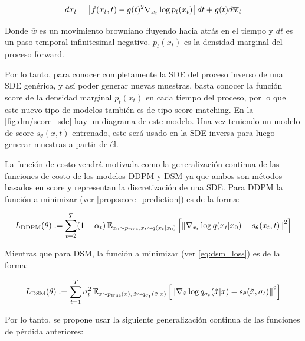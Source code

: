 \begin{equation}
    \label{eq:score_reverse_sde}
    dx_t = \left[f(x_t,t)-g(t)^2 \nabla_{x_t} \log p_t(x_t)\right]dt + g(t)d\overline{w}_t
\end{equation}

Donde $\overline{w}$ es un movimiento browniano fluyendo hacia atrás en el tiempo y $dt$ es un paso temporal infinitesimal negativo. $p_t(x_t)$ es la densidad marginal del proceso forward.

Por lo tanto, para conocer completamente la SDE del proceso inverso de una SDE genérica, y así poder generar nuevas muestras, basta conocer la función score de la densidad marginal $p_t(x_t)$ en cada tiempo del proceso, por lo que este nuevo tipo de modelos también es de tipo score-matching. En la \autoref{fig:dm/score_sde} hay un diagrama de este modelo. Una vez teniendo un modelo de score $s_\theta(x,t)$ entrenado, este será usado en la SDE inversa para luego generar muestras a partir de él.


La función de costo vendrá motivada como la generalización continua de las funciones de costo de los modelos DDPM y DSM ya que ambos son métodos basados en score y representan la discretización de una SDE. Para DDPM la función a minimizar (ver \autoref{prop:score_prediction}) es de la forma:

\begin{equation}
    L_{\text{DDPM}}(\theta) := \sum_{t=2}^T (1-\bar\alpha_t)\,\mathbb{E}_{x_0\sim p_{\operatorname{true}}, x_t\sim q(x_t|x_0)}\left[\left\lVert \nabla_{x_t}\log q(x_t|x_0) - s_\theta(x_t,t) \right\rVert^2\right]
\end{equation}

Mientras que para DSM, la función a minimizar (ver \eqref{eq:dsm_loss}) es de la forma:

\begin{align}
    L_{\text{DSM}}(\theta) := \sum_{t=1}^T \sigma_t^2 \,\mathbb{E}_{x\sim p_{\operatorname{true}}(x),\,\tilde{x}\sim q_{\sigma_t}(\tilde{x}|x)}\left[\left\lVert \nabla_{\tilde{x}}\log q_{\sigma_t}(\tilde{x}|x) - s_\theta(\tilde{x}, \sigma_t) \right\rVert^2\right]
\end{align}

Por lo tanto, se propone usar la siguiente generalización continua de las funciones de pérdida anteriores:

